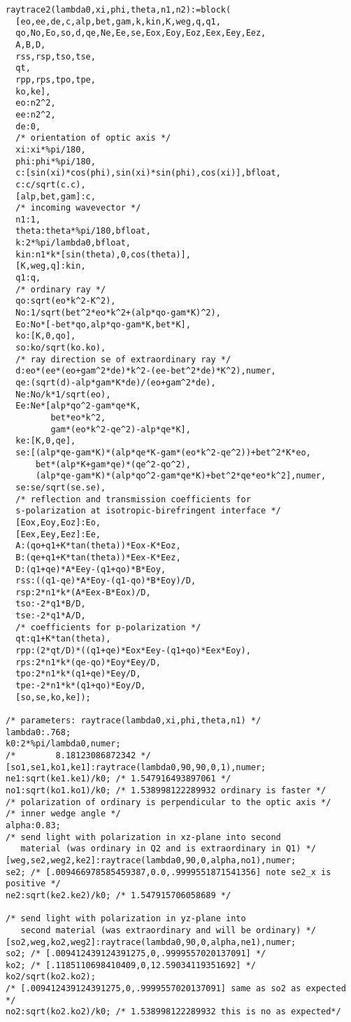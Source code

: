 \begin{lstlisting}
raytrace2(lambda0,xi,phi,theta,n1,n2):=block(
  [eo,ee,de,c,alp,bet,gam,k,kin,K,weg,q,q1,
  qo,No,Eo,so,d,qe,Ne,Ee,se,Eox,Eoy,Eoz,Eex,Eey,Eez,
  A,B,D,
  rss,rsp,tso,tse,
  qt,
  rpp,rps,tpo,tpe,
  ko,ke],
  eo:n2^2,
  ee:n2^2,
  de:0,
  /* orientation of optic axis */
  xi:xi*%pi/180,
  phi:phi*%pi/180,
  c:[sin(xi)*cos(phi),sin(xi)*sin(phi),cos(xi)],bfloat,
  c:c/sqrt(c.c),
  [alp,bet,gam]:c,
  /* incoming wavevector */
  n1:1,
  theta:theta*%pi/180,bfloat,
  k:2*%pi/lambda0,bfloat,
  kin:n1*k*[sin(theta),0,cos(theta)],
  [K,weg,q]:kin,
  q1:q,
  /* ordinary ray */
  qo:sqrt(eo*k^2-K^2),
  No:1/sqrt(bet^2*eo*k^2+(alp*qo-gam*K)^2),
  Eo:No*[-bet*qo,alp*qo-gam*K,bet*K],
  ko:[K,0,qo],
  so:ko/sqrt(ko.ko),
  /* ray direction se of extraordinary ray */
  d:eo*(ee*(eo+gam^2*de)*k^2-(ee-bet^2*de)*K^2),numer,
  qe:(sqrt(d)-alp*gam*K*de)/(eo+gam^2*de),
  Ne:No/k*1/sqrt(eo),
  Ee:Ne*[alp*qo^2-gam*qe*K,
         bet*eo*k^2,
         gam*(eo*k^2-qe^2)-alp*qe*K],
  ke:[K,0,qe],       
  se:[(alp*qe-gam*K)*(alp*qe*K-gam*(eo*k^2-qe^2))+bet^2*K*eo,
      bet*(alp*K+gam*qe)*(qe^2-qo^2),
      (alp*qe-gam*K)*(alp*qo^2-gam*qe*K)+bet^2*qe*eo*k^2],numer,
  se:se/sqrt(se.se),
  /* reflection and transmission coefficients for
  s-polarization at isotropic-birefringent interface */
  [Eox,Eoy,Eoz]:Eo,
  [Eex,Eey,Eez]:Ee,
  A:(qo+q1+K*tan(theta))*Eox-K*Eoz,
  B:(qe+q1+K*tan(theta))*Eex-K*Eez,
  D:(q1+qe)*A*Eey-(q1+qo)*B*Eoy,
  rss:((q1-qe)*A*Eoy-(q1-qo)*B*Eoy)/D,
  rsp:2*n1*k*(A*Eex-B*Eox)/D,
  tso:-2*q1*B/D,
  tse:-2*q1*A/D,
  /* coefficients for p-polarization */
  qt:q1+K*tan(theta),
  rpp:(2*qt/D)*((q1+qe)*Eox*Eey-(q1+qo)*Eex*Eoy),
  rps:2*n1*k*(qe-qo)*Eoy*Eey/D,
  tpo:2*n1*k*(q1+qe)*Eey/D,
  tpe:-2*n1*k*(q1+qo)*Eoy/D,
  [so,se,ko,ke]);

/* parameters: raytrace(lambda0,xi,phi,theta,n1) */
lambda0:.768;
k0:2*%pi/lambda0,numer;
/*        8.18123086872342 */
[so1,se1,ko1,ke1]:raytrace(lambda0,90,90,0,1),numer;
ne1:sqrt(ke1.ke1)/k0; /* 1.547916493897061 */
no1:sqrt(ko1.ko1)/k0; /* 1.538998122289932 ordinary is faster */
/* polarization of ordinary is perpendicular to the optic axis */
/* inner wedge angle */
alpha:0.83;
/* send light with polarization in xz-plane into second
   material (was ordinary in Q2 and is extraordinary in Q1) */ 
[weg,se2,weg2,ke2]:raytrace(lambda0,90,0,alpha,no1),numer;
se2; /* [.009466978585459387,0.0,.9999551871541356] note se2_x is positive */
ne2:sqrt(ke2.ke2)/k0; /* 1.547915706058689 */

/* send light with polarization in yz-plane into
   second material (was extraordinary and will be ordinary) */
[so2,weg,ko2,weg2]:raytrace(lambda0,90,0,alpha,ne1),numer;
so2; /* [.009412439124391275,0,.9999557020137091] */
ko2; /* [.1185110698410409,0,12.59034119351692] */
ko2/sqrt(ko2.ko2);
/* [.009412439124391275,0,.9999557020137091] same as so2 as expected */
no2:sqrt(ko2.ko2)/k0; /* 1.538998122289932 this is no as expected*/


\end{lstlisting}
